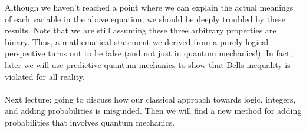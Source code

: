 \documentclass[a4paper]{article}
\begin{document}
Although we haven't reached a point where we can explain the actual meanings of each variable in the above equation, we should be deeply troubled by these results. Note that we are still assuming these three arbitrary properties are binary. Thus, a mathematical statement we derived from a purely logical perspective turns out to be false (and not just in quantum mechanics!). In fact, later we will use predictive quantum mechanics to show that Bells inequality is violated for all reality.  
\\
\\
Next lecture: going to discuss how our classical approach towards logic, integers, and adding probabilities is misguided. Then we will find a new method for adding probabilities that involves quantum mechanics. 
\end{document}
